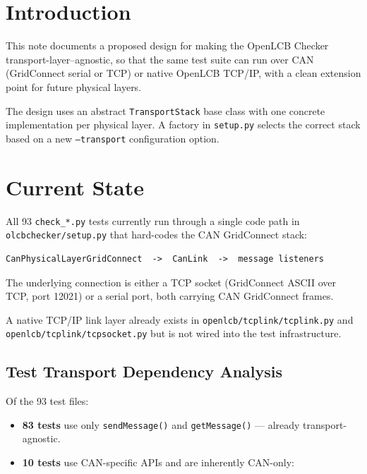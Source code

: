 



\maketitle
\thispagestyle{firststyle}

\section{Introduction}

This note documents a proposed design for making the OpenLCB Checker
transport-layer--agnostic, so that the same test suite can run over
CAN (GridConnect serial or TCP) or native OpenLCB TCP/IP, with a clean
extension point for future physical layers.

The design uses an abstract \texttt{TransportStack} base class with one
concrete implementation per physical layer.  A factory in \texttt{setup.py}
selects the correct stack based on a new \texttt{--transport} configuration
option.

\section{Current State}

All 93 \texttt{check\_*.py} tests currently run through a single code path in
\texttt{olcbchecker/setup.py} that hard-codes the CAN GridConnect stack:

\begin{verbatim}
CanPhysicalLayerGridConnect  ->  CanLink  ->  message listeners
\end{verbatim}

The underlying connection is either a TCP socket (GridConnect ASCII over TCP,
port 12021) or a serial port, both carrying CAN GridConnect frames.

A native TCP/IP link layer already exists in
\texttt{openlcb/tcplink/tcplink.py} and \texttt{openlcb/tcplink/tcpsocket.py}
but is not wired into the test infrastructure.

\subsection{Test Transport Dependency Analysis}

Of the 93 test files:

\begin{itemize}
\item \textbf{83 tests} use only \texttt{sendMessage()} and
    \texttt{getMessage()} --- already transport-agnostic.
\item \textbf{10 tests} use CAN-specific APIs and are inherently
    CAN-only:
\end{itemize}

